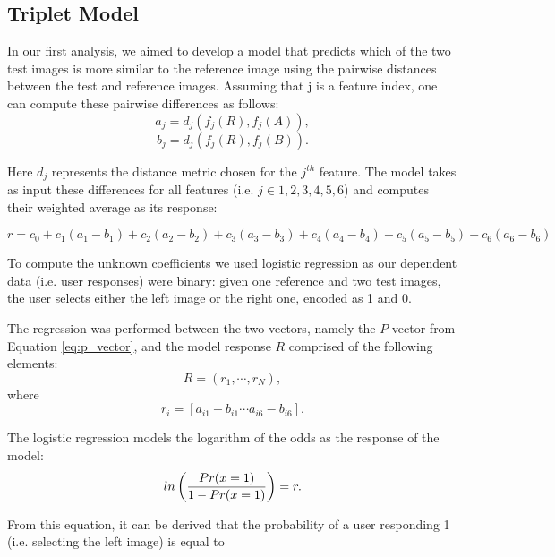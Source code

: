 \subsection{Triplet Model}
In our first analysis, we aimed to develop a model that
predicts which of the two test images is more similar to the reference image using the pairwise distances between the test and reference images. Assuming that j is a feature index, one can compute these pairwise differences as follows:
\begin{equation}
    a_j = d_j(f_j(R), f_j(A)), 
\end{equation}
\begin{equation}
   b_j = d_j(f_j(R), f_j(B)). 
\end{equation}

Here $d_j$ represents the distance metric chosen for the $j^{th}$ feature. The model takes as input these differences for all features (i.e. $j \in {1, 2, 3, 4, 5, 6}$) and computes their weighted average as its response:

\begin{equation}
    r = c_0 + c_1(a_1 - b_1) + c_2(a_2 - b_2) + c_3(a_3 - b_3)+ c_4(a_4 - b_4) + c_5(a_5 - b_5) + c_6(a_6 - b_6)
\end{equation}
 

To compute the unknown coefficients we used logistic regression as our dependent data (i.e. user responses)
were binary: given one reference and two test images, the user selects either the left image or the right one,
encoded as 1 and 0.

The regression was performed between the two vectors, namely the $P$ vector from Equation \ref{eq:p_vector}, and the model response $R$ comprised of the following elements:
\begin{equation}
    R = (r_1,\cdots, r_N ),
\end{equation}
where
\begin{equation}
    r_i = [a_{i1} - b_{i1} \cdots a_{i6} - b_{i6}].
\end{equation}

The logistic regression models the logarithm of the odds as the response of the model:
\begin{equation}
   ln \left( {{Pr(x = 1)} \over { 1 - Pr(x = 1)}} \right) = r. 
\end{equation}


From this equation, it can be derived that the probability of a user responding 1 (i.e. selecting the left image)
is equal to


